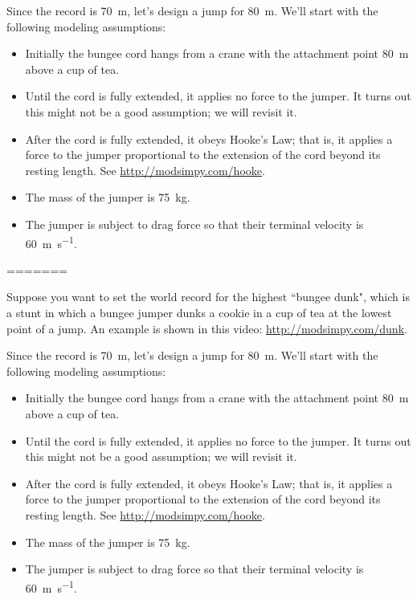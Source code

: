 \documentclass[12pt]{book}
\theoremstyle{exercise}
\begin{document}
Since the record is \SI{70}{\meter}, let's design a jump for \SI{80}{\meter}.  We'll start with the following modeling assumptions:

\begin{itemize}

\item  Initially the bungee cord hangs from a crane with the attachment point \SI{80}{\meter} above a cup of tea.

\item Until the cord is fully extended, it applies no force to the jumper.  It turns out this might not be a good assumption; we will revisit it.

\item After the cord is fully extended, it obeys Hooke's Law; that is, it applies a force to the jumper proportional to the extension of the cord beyond its resting length.  See \url{http://modsimpy.com/hooke}. 

\item The mass of the jumper is \SI{75}{\kilogram}.

\item The jumper is subject to drag force so that their terminal velocity is \SI{60}{\meter \per \second}.

\end{itemize}

=======

Suppose you want to set the world record for the highest ``bungee dunk", which is a stunt in which a bungee jumper dunks a cookie in a cup of tea at the lowest point of a jump.  An example is shown in this video: \url{http://modsimpy.com/dunk}.

Since the record is \SI{70}{\meter}, let's design a jump for \SI{80}{\meter}.  We'll start with the following modeling assumptions:

\begin{itemize}

\item  Initially the bungee cord hangs from a crane with the attachment point \SI{80}{\meter} above a cup of tea.

\item Until the cord is fully extended, it applies no force to the jumper.  It turns out this might not be a good assumption; we will revisit it.

\item After the cord is fully extended, it obeys Hooke's Law; that is, it applies a force to the jumper proportional to the extension of the cord beyond its resting length.  See \url{http://modsimpy.com/hooke}. 

\item The mass of the jumper is \SI{75}{\kilogram}.

\item The jumper is subject to drag force so that their terminal velocity is \SI{60}{\meter \per \second}.

\end{itemize}
\end{document}
